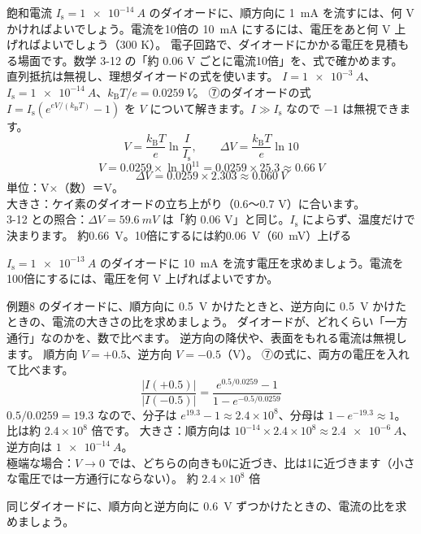 \label{ph:原-9:ex8}
\begin{phreidai}[ダイオードの電圧と「60 mV で10倍」]
飽和電流 $I_{\mathrm s}=\qty{1e-14}{A}$ のダイオードに、順方向に \qty{1}{mA} を流すには、何 V かければよいでしょう。電流を10倍の \qty{10}{mA} にするには、電圧をあと何 V 上げればよいでしょう（300 K）。
\phbamen
電子回路で、ダイオードにかかる電圧を見積もる場面です。数学 3-12 の「約 0.06 V ごとに電流10倍」を、式で確かめます。
\phmushi
直列抵抗は無視し、理想ダイオードの式を使います。
\phzu
$I=\qty{1e-3}{A}$、$I_{\mathrm s}=\qty{1e-14}{A}$、$k_{\mathrm B}T/e=\qty{0.0259}{V}$。
\phriyu
⑦のダイオードの式 $I=I_{\mathrm s}(e^{eV/(k_{\mathrm B}T)}-1)$ を $V$ について解きます。$I\gg I_{\mathrm s}$ なので $-1$ は無視できます。
\phtateru
\[ V=\frac{k_{\mathrm B}T}{e}\ln\frac{I}{I_{\mathrm s}},\qquad \Delta V=\frac{k_{\mathrm B}T}{e}\ln10 \]
\phtoku
\[ V=0.0259\times\ln10^{11}=0.0259\times25.3\approx\qty{0.66}{V} \]
\[ \Delta V=0.0259\times2.303\approx\qty{0.060}{V} \]
\phtashikame
単位：V×（数）＝V。\\
大きさ：ケイ素のダイオードの立ち上がり（0.6〜0.7 V）に合います。\\
3-12 との照合：$\Delta V=\qty{59.6}{mV}$ は「約 0.06 V」と同じ。$I_{\mathrm s}$ によらず、温度だけで決まります。
\kotae 約\qty{0.66}{V}。10倍にするには約\qty{0.06}{V}（\qty{60}{mV}）上げる
\end{phreidai}
\begin{jibun}
$I_{\mathrm s}=\qty{1e-13}{A}$ のダイオードに \qty{10}{mA} を流す電圧を求めましょう。電流を100倍にするには、電圧を何 V 上げればよいですか。
\end{jibun}

\label{ph:原-9:ex9}
\begin{phreidai}[一方通行の度合い（整流）]
例題8 のダイオードに、順方向に \qty{0.5}{V} かけたときと、逆方向に \qty{0.5}{V} かけたときの、電流の大きさの比を求めましょう。
\phbamen
ダイオードが、どれくらい「一方通行」なのかを、数で比べます。
\phmushi
逆方向の降伏や、表面をもれる電流は無視します。
\phzu
順方向 $V=+0.5$、逆方向 $V=-0.5$（V）。
\phriyu
⑦の式に、両方の電圧を入れて比べます。
\phtateru
\[ \frac{|I(+0.5)|}{|I(-0.5)|}=\frac{e^{0.5/0.0259}-1}{1-e^{-0.5/0.0259}} \]
\phtoku
$0.5/0.0259=19.3$ なので、分子は $e^{19.3}-1\approx2.4\times10^8$、分母は $1-e^{-19.3}\approx1$。比は約 $2.4\times10^8$ 倍です。
\phtashikame
大きさ：順方向は $10^{-14}\times2.4\times10^8\approx\qty{2.4e-6}{A}$、逆方向は $\qty{1e-14}{A}$。\\
極端な場合：$V\to0$ では、どちらの向きも0に近づき、比は1に近づきます（小さな電圧では一方通行にならない）。
\kotae 約 $2.4\times10^8$ 倍
\end{phreidai}
\begin{jibun}
同じダイオードに、順方向と逆方向に \qty{0.6}{V} ずつかけたときの、電流の比を求めましょう。
\end{jibun}

